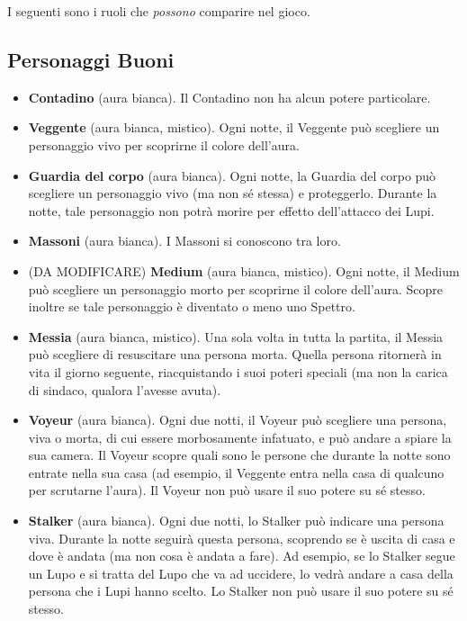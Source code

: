 \documentclass[a4paper,10pt]{article}
\begin{document}
I seguenti sono i ruoli che \emph{possono} comparire nel gioco.


\subsection*{Personaggi Buoni}

\begin{itemize}
 \item {\bf Contadino} (aura bianca). Il Contadino non ha alcun potere particolare.
 
 \item {\bf Veggente} (aura bianca, mistico). Ogni notte, il Veggente può scegliere un personaggio vivo per scoprirne il colore dell'aura.

 \item {\bf Guardia del corpo} (aura bianca). Ogni notte, la Guardia del corpo può scegliere un personaggio vivo (ma non sé stessa) e proteggerlo. Durante la notte, tale personaggio non potrà morire per effetto dell'attacco dei Lupi.
 
 \item {\bf Massoni} (aura bianca). I Massoni si conoscono tra loro.
 
 \item (DA MODIFICARE) {\bf Medium} (aura bianca, mistico). Ogni notte, il Medium può scegliere un personaggio morto per scoprirne il colore dell'aura. Scopre inoltre se tale personaggio è diventato o meno uno Spettro.

 \item {\bf Messia} (aura bianca, mistico). Una sola volta in tutta la partita, il Messia può scegliere di resuscitare una persona morta. Quella persona ritornerà in vita il giorno seguente, riacquistando i suoi poteri speciali (ma non la carica di sindaco, qualora l'avesse avuta).

 \item {\bf Voyeur} (aura bianca). Ogni due notti, il Voyeur può scegliere una persona, viva o morta, di cui essere morbosamente infatuato, e può andare a spiare la sua camera. Il Voyeur scopre quali sono le persone che durante la notte sono entrate nella sua casa (ad esempio, il Veggente entra nella casa di qualcuno per scrutarne l'aura).
 Il Voyeur non può usare il suo potere su sé stesso.

 \item {\bf Stalker} (aura bianca). Ogni due notti, lo Stalker può indicare una persona viva. Durante la notte seguirà questa persona, scoprendo se è uscita di casa e dove è andata (ma non cosa è andata a fare).
 Ad esempio, se lo Stalker segue un Lupo e si tratta del Lupo che va ad uccidere, lo vedrà andare a casa della persona che i Lupi hanno scelto.
 Lo Stalker non può usare il suo potere su sé stesso.
 

\end{itemize}
\end{document}
